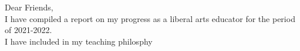 \documentclass[../../main.tex]{subfiles}
\begin{document}
Dear Friends,
\\
\vspace{0.15cm}
I have compiled a report on my progress as a liberal arts educator for the period of 2021-2022.
\\
\vspace{0.15cm}
I have included in my teaching philosphy 
\end{document}
